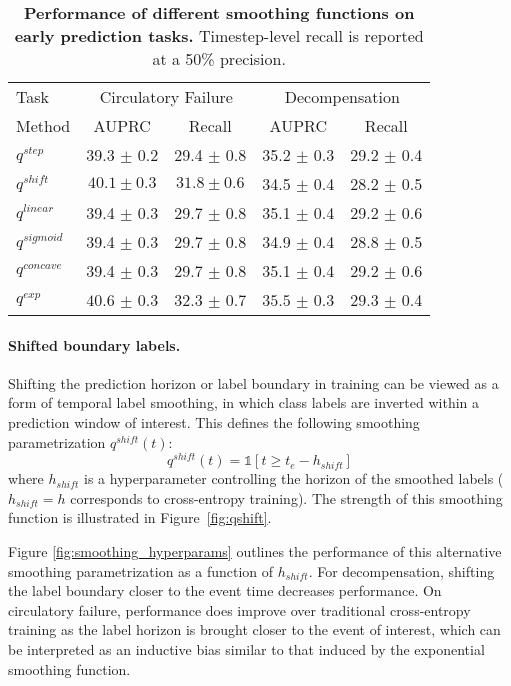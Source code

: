 \documentclass[nohyperref]{article}
\begin{document}
\begin{table}[h] \centering
    \caption{\textbf{Performance of different smoothing functions on early prediction tasks.} Timestep-level recall is reported at a 50\% precision.} \label{tab:other_fn}
\begin{tabular}{lcccc}
\toprule

 Task & \multicolumn{2}{c}{Circulatory Failure} & \multicolumn{2}{c}{Decompensation} \\
 \cmidrule(lr){2-3} \cmidrule(lr){4-5}
Method &         AUPRC &   Recall &         AUPRC &   Recall \\
\midrule
$q^{step}$              &             39.3 $\pm$ 0.2 &             29.4 $\pm$ 0.8 &             35.2 $\pm$ 0.3 &             29.2 $\pm$ 0.4  \\
{$q^{shift}$} & {$40.1 \pm 0.3$} & {$31.8 \pm 0.6$} & {34.5 $\pm$ 0.4} &  {28.2 $\pm$ 0.5}  \\
$q^{linear}$      &  39.4 $\pm$ 0.3 &             29.7 $\pm$ 0.8 &             35.1 $\pm$ 0.4 &             29.2 $\pm$ 0.6  \\
$q^{sigmoid}$     & 39.4 $\pm$ 0.3 &             29.7 $\pm$ 0.8 &             34.9 $\pm$ 0.4 &             28.8 $\pm$ 0.5 \\
{$q^{concave}$}      &  {39.4 $\pm$ 0.3} &             {29.7 $\pm$ 0.8} &             {35.1 $\pm$ 0.4} &             {29.2 $\pm$ 0.6}  \\
$q^{exp}$   &  $\mathbf{40.6}$ $\pm$ 0.3 &  $\mathbf{32.3}$ $\pm$ 0.7 &  $\mathbf{35.5}$ $\pm$ 0.3 &  $\mathbf{29.3}$ $\pm$ 0.4  \\
\bottomrule
\end{tabular}\end{table}

{
\paragraph{Shifted boundary labels.}
Shifting the prediction horizon or label boundary in training can be viewed as a form of temporal label smoothing, in which class labels are inverted within a prediction window of interest. This defines the following smoothing parametrization $q^{shift}(t)$:
\begin{equation}
    q^{shift}( t) = \mathds{1}\left[ t \geq t_e - h_{shift} \right]
\end{equation}
where $h_{shift}$ is a hyperparameter controlling the horizon of the smoothed labels ($h_{shift}=h$ corresponds to cross-entropy training). The strength of this smoothing function is illustrated in Figure~\ref{fig:qshift}.

Figure \ref{fig:smoothing_hyperparams} outlines the performance of this alternative smoothing parametrization as a function of $h_{shift}$. For decompensation, shifting the label boundary closer to the event time decreases performance. On circulatory failure, performance does improve over traditional cross-entropy training as the label horizon is brought closer to the event of interest, which can be interpreted as an inductive bias similar to that induced by the exponential smoothing function.

}
\end{document}
